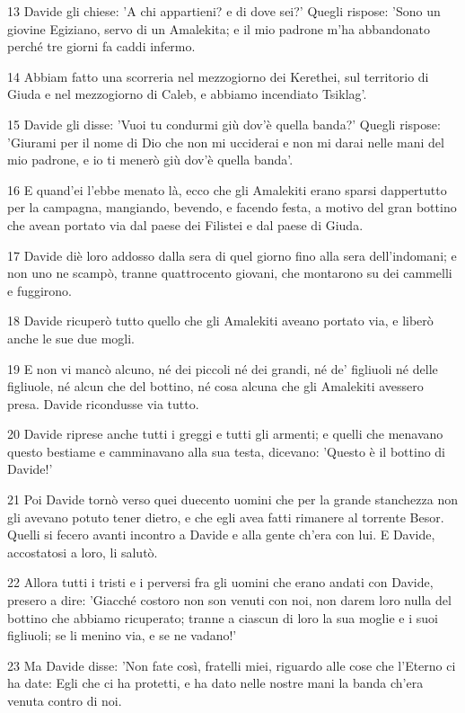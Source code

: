 \par 13 Davide gli chiese: 'A chi appartieni? e di dove sei?' Quegli rispose: 'Sono un giovine Egiziano, servo di un Amalekita; e il mio padrone m'ha abbandonato perché tre giorni fa caddi infermo.
\par 14 Abbiam fatto una scorreria nel mezzogiorno dei Kerethei, sul territorio di Giuda e nel mezzogiorno di Caleb, e abbiamo incendiato Tsiklag'.
\par 15 Davide gli disse: 'Vuoi tu condurmi giù dov'è quella banda?' Quegli rispose: 'Giurami per il nome di Dio che non mi ucciderai e non mi darai nelle mani del mio padrone, e io ti menerò giù dov'è quella banda'.
\par 16 E quand'ei l'ebbe menato là, ecco che gli Amalekiti erano sparsi dappertutto per la campagna, mangiando, bevendo, e facendo festa, a motivo del gran bottino che avean portato via dal paese dei Filistei e dal paese di Giuda.
\par 17 Davide diè loro addosso dalla sera di quel giorno fino alla sera dell'indomani; e non uno ne scampò, tranne quattrocento giovani, che montarono su dei cammelli e fuggirono.
\par 18 Davide ricuperò tutto quello che gli Amalekiti aveano portato via, e liberò anche le sue due mogli.
\par 19 E non vi mancò alcuno, né dei piccoli né dei grandi, né de' figliuoli né delle figliuole, né alcun che del bottino, né cosa alcuna che gli Amalekiti avessero presa. Davide ricondusse via tutto.
\par 20 Davide riprese anche tutti i greggi e tutti gli armenti; e quelli che menavano questo bestiame e camminavano alla sua testa, dicevano: 'Questo è il bottino di Davide!'
\par 21 Poi Davide tornò verso quei duecento uomini che per la grande stanchezza non gli avevano potuto tener dietro, e che egli avea fatti rimanere al torrente Besor. Quelli si fecero avanti incontro a Davide e alla gente ch'era con lui. E Davide, accostatosi a loro, li salutò.
\par 22 Allora tutti i tristi e i perversi fra gli uomini che erano andati con Davide, presero a dire: 'Giacché costoro non son venuti con noi, non darem loro nulla del bottino che abbiamo ricuperato; tranne a ciascun di loro la sua moglie e i suoi figliuoli; se li menino via, e se ne vadano!'
\par 23 Ma Davide disse: 'Non fate così, fratelli miei, riguardo alle cose che l'Eterno ci ha date: Egli che ci ha protetti, e ha dato nelle nostre mani la banda ch'era venuta contro di noi.
